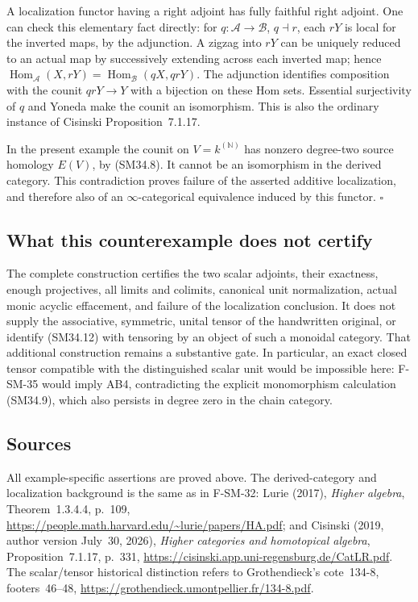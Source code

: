 A localization functor having a right adjoint has fully
faithful right adjoint.  One can check this elementary fact
directly: for \(q:\mathcal A\to\mathcal B\),
\(q\dashv r\), each \(rY\) is local for the inverted
maps, by the adjunction.  A zigzag into \(rY\) can be
uniquely reduced to an actual map by successively extending
across each inverted map; hence
\(\operatorname{Hom}_{\mathcal A}(X,rY)=
\operatorname{Hom}_{\mathcal B}(qX,qrY)\).
The adjunction identifies composition with the counit
\(qrY\to Y\) with a bijection on these Hom sets.
Essential surjectivity of \(q\) and Yoneda make the
counit an isomorphism.  This is also the ordinary instance
of Cisinski Proposition~7.1.17.

In the present example the counit on
\(V=k^{(\mathbb N)}\) has nonzero degree-two source
homology \(E(V)\), by (SM34.8).  It cannot be an
isomorphism in the derived category.  This contradiction
proves failure of the asserted additive localization,
and therefore also of an \(\infty\)-categorical
equivalence induced by this functor. \(\square\)

\subsection{What this counterexample does not certify}
The complete construction certifies the two scalar adjoints,
their exactness, enough projectives, all limits and colimits,
canonical unit normalization, actual monic acyclic
effacement, and failure of the localization conclusion.
It does not supply the associative, symmetric, unital
tensor of the handwritten original, or identify (SM34.12)
with tensoring by an object of such a monoidal category.
That additional construction remains a substantive gate.
In particular, an exact closed tensor compatible with
the distinguished scalar unit would be impossible here:
F-SM-35 would imply AB4, contradicting the explicit
monomorphism calculation (SM34.9), which also persists in
degree zero in the chain category.

\subsection{Sources}
All example-specific assertions are proved above.  The
derived-category and localization background is the same
as in F-SM-32: Lurie (2017), \emph{Higher algebra},
Theorem~1.3.4.4, p.~109,
\url{https://people.math.harvard.edu/~lurie/papers/HA.pdf};
and Cisinski (2019, author version July~30, 2026),
\emph{Higher categories and homotopical algebra},
Proposition~7.1.17, p.~331,
\url{https://cisinski.app.uni-regensburg.de/CatLR.pdf}.
The scalar/tensor historical distinction refers to
Grothendieck's cote~134-8, footers~46--48,
\url{https://grothendieck.umontpellier.fr/134-8.pdf}.
